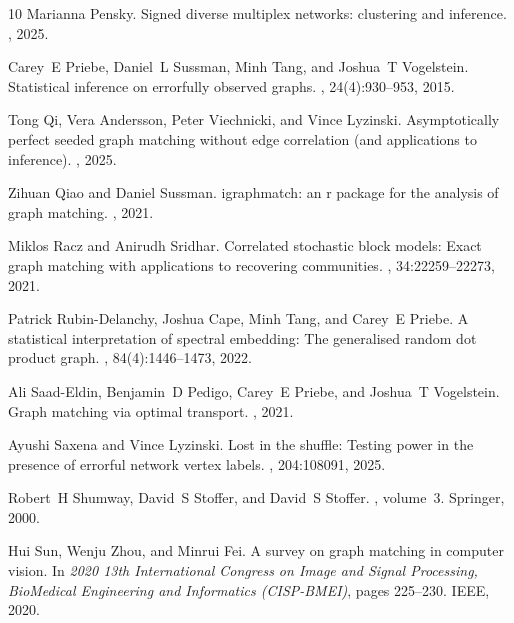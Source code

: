 \documentclass[12pt]{article}
\theoremstyle{definition}
\begin{document}
\begin{thebibliography}{10}
Marianna Pensky.
\newblock Signed diverse multiplex networks: clustering and inference.
, 2025.

Carey~E Priebe, Daniel~L Sussman, Minh Tang, and Joshua~T Vogelstein.
\newblock Statistical inference on errorfully observed graphs.
, 24(4):930--953, 2015.

Tong Qi, Vera Andersson, Peter Viechnicki, and Vince Lyzinski.
\newblock Asymptotically perfect seeded graph matching without edge correlation (and applications to inference).
, 2025.

Zihuan Qiao and Daniel Sussman.
\newblock igraphmatch: an r package for the analysis of graph matching.
, 2021.

Miklos Racz and Anirudh Sridhar.
\newblock Correlated stochastic block models: Exact graph matching with applications to recovering communities.
, 34:22259--22273, 2021.

Patrick Rubin-Delanchy, Joshua Cape, Minh Tang, and Carey~E Priebe.
\newblock A statistical interpretation of spectral embedding: The generalised random dot product graph.
, 84(4):1446--1473, 2022.

Ali Saad-Eldin, Benjamin~D Pedigo, Carey~E Priebe, and Joshua~T Vogelstein.
\newblock Graph matching via optimal transport.
, 2021.

Ayushi Saxena and Vince Lyzinski.
\newblock Lost in the shuffle: Testing power in the presence of errorful network vertex labels.
, 204:108091, 2025.

Robert~H Shumway, David~S Stoffer, and David~S Stoffer.
, volume~3.
\newblock Springer, 2000.

Hui Sun, Wenju Zhou, and Minrui Fei.
\newblock A survey on graph matching in computer vision.
\newblock In {\em 2020 13th International Congress on Image and Signal Processing, BioMedical Engineering and Informatics (CISP-BMEI)}, pages 225--230. IEEE, 2020.


\end{thebibliography}
\end{document}

